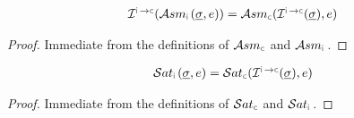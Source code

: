 \begin{lemma}\label{lemma:erasure:assume}
$$
\begin{array}{l}
\interpret{\instconc}{}(\absassume{\instrumented}(\istate, \jsilexpr)) = \absassume{\concrete}( \interpret{\instconc}{}(\istate), \jsilexpr) 
\end{array}
$$
\end{lemma}
\begin{proof}
Immediate from the definitions of $\absassume{\concrete}$ and $\absassume{\instrumented}$.
\end{proof}

\begin{lemma}\label{lemma:erasure:sat}
$$
\begin{array}{l}
      \abssat{\instrumented}(\istate, \jsilexpr) =  \abssat{\concrete}(\interpret{\instconc}{}(\istate), \jsilexpr) 
\end{array}
$$
\end{lemma}
\begin{proof}
Immediate from the definitions of $\abssat{\concrete}$ and $\abssat{\instrumented}$.
\end{proof}

